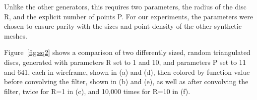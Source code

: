 Unlike the other generators, this requires two parameters, the radius of the disc R, and the explicit number of points P. For our experiments, the parameters were chosen to ensure parity with the sizes and point density of the other synthetic meshes.



Figure~\ref{fig:sq2} shows a comparison of two differently sized, random triangulated discs, generated with parameters R set to 1 and 10, and parameters P set to 11 and 641, each in wireframe, shown in (a) and (d), then colored by function value before convolving the filter, shown in (b) and (e), as well as after convolving the filter, twice for R=1 in (c), and 10,000 times for R=10 in (f).

